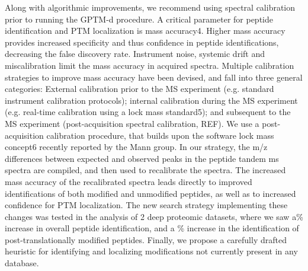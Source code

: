 \documentclass[journal=jprobs,manuscript=article]{achemso}
\begin{document}
Along with algorithmic improvements, we recommend using spectral calibration prior to running the GPTM-d procedure. A critical parameter for peptide identification and PTM localization is mass accuracy4. Higher mass accuracy provides increased specificity and thus confidence in peptide identifications, decreasing the false discovery rate.  Instrument noise, systemic drift and miscalibration limit the mass accuracy in acquired spectra.  Multiple calibration strategies to improve mass accuracy have been devised, and fall into three general categories:  External calibration prior to the MS experiment (e.g. standard instrument calibration protocols); internal calibration during the MS experiment (e.g. real-time calibration using a lock mass standard5); and subsequent to the MS experiment (post-acquisition spectral calibration, REF).  We use a post-acquisition calibration procedure, that builds upon the software lock mass concept6 recently reported by the Mann group.  In our strategy, the m/z differences between expected and observed peaks in the peptide tandem ms spectra are compiled, and then used to recalibrate the spectra.  The increased mass accuracy of the recalibrated spectra leads directly to improved identifications of both modified and unmodified peptides, as well as to increased confidence for PTM localization.  
The new search strategy implementing these changes was tested in the analysis of 2 deep proteomic datasets, where we saw a\% increase in overall peptide identification, and a \% increase in the identification of post-translationally modified peptides.
Finally, we propose a carefully drafted heuristic for identifying and localizing modifications not currently present in any database.
\end{document}
